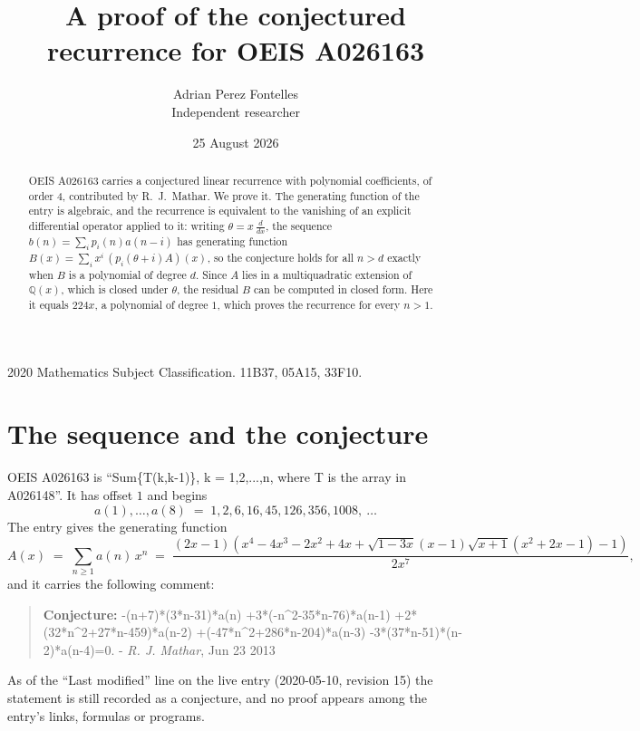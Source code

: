 \documentclass[11pt,a4paper]{article}
\title{A proof of the conjectured recurrence for OEIS A026163}
\author{Adrian Perez Fontelles\\ \small Independent researcher}
\date{25 August 2026}
\theoremstyle{plain}
\theoremstyle{definition}
\begin{document}
\maketitle

\begin{abstract}
OEIS A026163 carries a conjectured linear recurrence with polynomial coefficients, of
order 4, contributed by R.~J.~Mathar. We prove it. The generating function of the
entry is algebraic, and the recurrence is equivalent to the vanishing of an explicit
differential operator applied to it: writing $\theta=x\,\frac{d}{dx}$, the sequence
$b(n)=\sum_{i}p_{i}(n)a(n-i)$ has generating function
$B(x)=\sum_{i}x^{i}\,(p_{i}(\theta+i)A)(x)$, so the conjecture holds for all $n>d$ exactly
when $B$ is a polynomial of degree $d$. Since $A$ lies in a multiquadratic extension of
$\mathbb{Q}(x)$, which is closed under $\theta$, the residual $B$ can be computed in
closed form. Here it equals $224 x$, a polynomial of degree $1$, which proves
the recurrence for every $n>1$.
\end{abstract}

\noindent\small 2020 Mathematics Subject Classification. 11B37, 05A15, 33F10.\normalsize

\section{The sequence and the conjecture}

OEIS A026163 is ``Sum\{T(k,k-1)\}, k = 1,2,...,n, where T is the array in A026148''. It has offset $1$ and begins
\[
a(1),\dots,a(8)\;=\;1, 2, 6, 16, 45, 126, 356, 1008,\ \dots
\]
The entry gives the generating function
\begin{equation}\label{eq:gf}
A(x)\;=\;\sum_{n\ge 1} a(n)\,x^{n}\;=\;\frac{\left(2 x - 1\right) \left(x^{4} - 4 x^{3} - 2 x^{2} + 4 x + \sqrt{1 - 3 x} \left(x - 1\right) \sqrt{x + 1} \left(x^{2} + 2 x - 1\right) - 1\right)}{2 x^{7}} ,
\end{equation}
and it carries the following comment:
\begin{quote}\small
\textbf{Conjecture:} -(n+7)*(3*n-31)*a(n) +3*(-n\^{}2-35*n-76)*a(n-1) +2*(32*n\^{}2+27*n-459)*a(n-2) +(-47*n\^{}2+286*n-204)*a(n-3) -3*(37*n-51)*(n-2)*a(n-4)=0. - \emph{R. J. Mathar}, Jun 23 2013
\end{quote}
As of the ``Last modified'' line on the live entry (2020-05-10, revision 15) the
statement is still recorded as a conjecture, and no proof appears among the entry's links,
formulas or programs.
\end{document}
